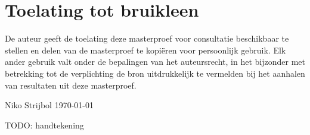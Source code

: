 \chapter*{Toelating tot bruikleen}

De auteur geeft de toelating deze masterproef voor consultatie beschikbaar te stellen en delen van de masterproef te kopiëren voor persoonlijk gebruik.
Elk ander gebruik valt onder de bepalingen van het auteursrecht, in het bijzonder met betrekking tot de verplichting de bron uitdrukkelijk te vermelden bij het aanhalen van resultaten uit deze masterproef.

\begin{flushright}
    Niko Strijbol
    \today
\end{flushright}

TODO: handtekening